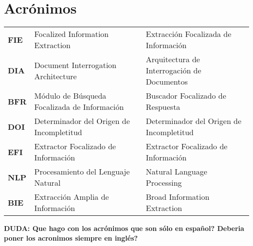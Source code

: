 \chapter*{Acrónimos}

\newcommand{\TERM}[3]{
	\textbf{#1} & #3 & #2 \\[5pt]
}

\begin{longtable}{p{1in}p{2.2in}p{3in}}

		\TERM{FIE}{Extracción Focalizada de Información}{Focalized Information Extraction}
		\TERM{DIA}{Arquitectura de Interrogación de Documentos}{Document Interrogation Architecture}
		\TERM{BFR}{Buscador Focalizado de Respuesta}{Módulo de Búsqueda Focalizada de Información}
		\TERM{DOI}{Determinador del Origen de Incompletitud}{Determinador del Origen de Incompletitud}		
		\TERM{EFI}{Extractor Focalizado de Información}{Extractor Focalizado de Información}
		\TERM{NLP}{Natural Language Processing}{Procesamiento del Lenguaje Natural}				
		\TERM{BIE}{Broad Information Extraction}{Extracción Amplia de Información}				

\end{longtable}

		\textbf{DUDA: Que hago con los acrónimos que son sólo en español? Deberia poner los acronimos siempre en inglés?}
		
\newpage
